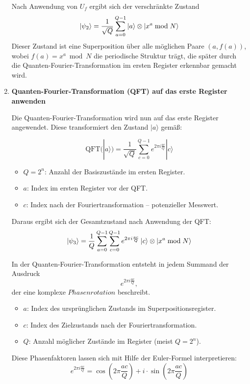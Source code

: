 \begin{enumerate}
Nach Anwendung von \( U_f \) ergibt sich der verschränkte Zustand
\[
\ket{\psi_2} = \frac{1}{\sqrt{Q}} \sum_{a=0}^{Q-1} \ket{a} \otimes \ket{x^a \bmod N}
\]
Dieser Zustand ist eine Superposition über alle möglichen Paare \( (a, f(a)) \), wobei \( f(a) = x^a \bmod N \) die periodische Struktur trägt, die später durch die Quanten-Fourier-Transformation im ersten Register erkennbar gemacht wird.\\

\item \textbf{Quanten-Fourier-Transformation (QFT) auf das erste Register anwenden}

\noindent Die Quanten-Fourier-Transformation wird nun auf das erste Register angewendet. Diese transformiert den Zustand \( |a\rangle \) gemäß:

\[
\mathrm{QFT}(|a\rangle) = \frac{1}{\sqrt{Q}} \sum_{c=0}^{Q-1} e^{2\pi i \frac{a c}{Q}} |c\rangle
\]

\begin{itemize}
    \item \( Q = 2^n \): Anzahl der Basiszustände im ersten Register.
    \item \( a \): Index im ersten Register vor der QFT.
    \item \( c \): Index nach der Fouriertransformation – potenzieller Messwert.
\end{itemize}

\noindent Daraus ergibt sich der Gesamtzustand nach Anwendung der QFT:
\[
\ket{\psi_3} = \frac{1}{Q} \sum_{a=0}^{Q-1} \sum_{c=0}^{Q-1} e^{2\pi i \frac{a c}{Q}} \ket{c} \otimes \ket{x^a \bmod N}
\]

\noindent In der Quanten-Fourier-Transformation entsteht in jedem Summand der Ausdruck
\[
e^{2\pi i \frac{a c}{Q}},
\]
der eine komplexe \(Phasenrotation\) beschreibt.

\begin{itemize}
    \item \textbf{\( a \)}: Index des ursprünglichen Zustands im Superpositionsregister.
    \item \textbf{\( c \)}: Index des Zielzustands nach der Fouriertransformation.
    \item \textbf{\( Q \)}: Anzahl möglicher Zustände im Register (meist \( Q = 2^n \)).
\end{itemize}

\noindent Diese Phasenfaktoren lassen sich mit Hilfe der Euler-Formel interpretieren:
\[
e^{2\pi i \frac{a c}{Q}} = \cos\left(2\pi \frac{a c}{Q}\right) + i \cdot \sin\left(2\pi \frac{a c}{Q}\right)
\]


\end{enumerate}

